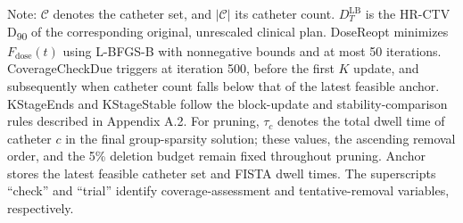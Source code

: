 \documentclass[12pt,twoside,letterpaper]{article}
\makeatletter
\newcommand{\compactformat}{\setstretch{1}\fontsize{8}{9.6}\selectfont}
\newcounter{algorithm}
\newenvironment{algorithmblock}{%
  \begin{table}[H]\begin{minipage}{\linewidth}%
  \compactformat\let\footnotesize\compactformat
  \def\@captype{algorithm}%
}{\end{minipage}\end{table}}
\makeatother
\begin{document}
\begin{algorithmblock}
\noindent Note: $\mathcal{C}$ denotes the catheter set, and $\left| \mathcal{C} \right|$ its catheter count. $D_{T}^{\text{LB}}$ is the HR-CTV D\textsubscript{90} of the corresponding original, unrescaled clinical plan. DoseReopt minimizes $F_{\text{dose}}\left( t \right)$ using L-BFGS-B with nonnegative bounds and at most 50 iterations. CoverageCheckDue triggers at iteration 500, before the first $K$ update, and subsequently when catheter count falls below that of the latest feasible anchor. KStageEnds and KStageStable follow the block-update and stability-comparison rules described in Appendix A.2. For pruning, $\tau_{c}$ denotes the total dwell time of catheter $c$ in the final group-sparsity solution; these values, the ascending removal order, and the 5\% deletion budget remain fixed throughout pruning. Anchor stores the latest feasible catheter set and FISTA dwell times. The superscripts ``check'' and ``trial'' identify coverage-assessment and tentative-removal variables, respectively.\par
\end{algorithmblock}
\end{document}
